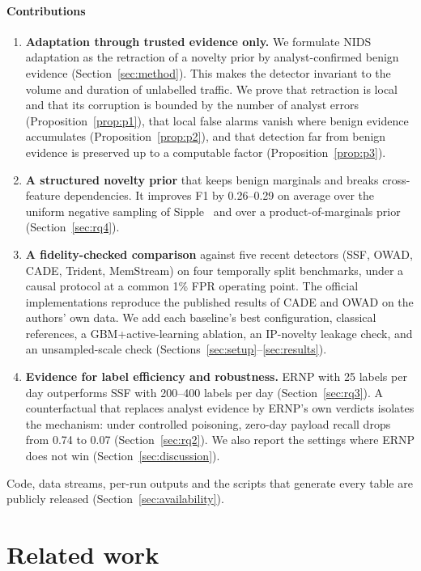 \documentclass[preprint,12pt]{elsarticle}
\begin{document}
\paragraph{Contributions}
\begin{enumerate}
\item \textbf{Adaptation through trusted evidence only.} We formulate NIDS adaptation as the retraction of a novelty prior by analyst-confirmed benign evidence (Section~\ref{sec:method}). This makes the detector invariant to the volume and duration of unlabelled traffic. We prove that retraction is local and that its corruption is bounded by the number of analyst errors (Proposition~\ref{prop:p1}), that local false alarms vanish where benign evidence accumulates (Proposition~\ref{prop:p2}), and that detection far from benign evidence is preserved up to a computable factor (Proposition~\ref{prop:p3}).
\item \textbf{A structured novelty prior} that keeps benign marginals and breaks cross-feature dependencies. It improves F1 by 0.26--0.29 on average over the uniform negative sampling of Sipple~\cite{sipple2020negative} and over a product-of-marginals prior (Section~\ref{sec:rq4}).
\item \textbf{A fidelity-checked comparison} against five recent detectors (SSF, OWAD, CADE, Trident, MemStream) on four temporally split benchmarks, under a causal protocol at a common 1\% FPR operating point. The official implementations reproduce the published results of CADE and OWAD on the authors' own data. We add each baseline's best configuration, classical references, a GBM+active-learning ablation, an IP-novelty leakage check, and an unsampled-scale check (Sections~\ref{sec:setup}--\ref{sec:results}).
\item \textbf{Evidence for label efficiency and robustness.} ERNP with 25 labels per day outperforms SSF with 200--400 labels per day (Section~\ref{sec:rq3}). A counterfactual that replaces analyst evidence by ERNP's own verdicts isolates the mechanism: under controlled poisoning, zero-day payload recall drops from 0.74 to 0.07 (Section~\ref{sec:rq2}). We also report the settings where ERNP does not win (Section~\ref{sec:discussion}).
\end{enumerate}
Code, data streams, per-run outputs and the scripts that generate every table are publicly released (Section~\ref{sec:availability}).

\section{Related work}\label{sec:related}
\end{document}
